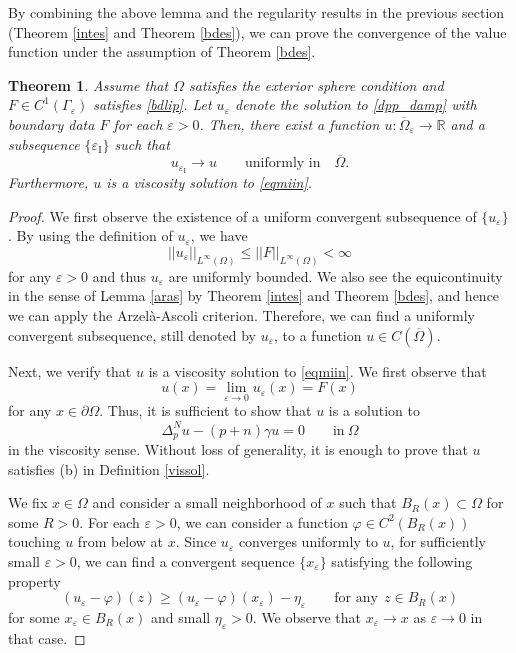 \documentclass[english]{amsart}
\newcommand{\eps}{\varepsilon}
\theoremstyle{plain}
\newtheorem{theorem}[definition]{Theorem}
\theoremstyle{definition}
\theoremstyle{remark}
\numberwithin{equation}{section}
\begin{document}
By combining the above lemma and the regularity results in the previous section (Theorem \ref{intes} and Theorem \ref{bdes}), 
we can prove the convergence of the value function under the assumption of Theorem \ref{bdes}.
\begin{theorem}\label{conv}Assume that $\Omega$ satisfies the exterior sphere condition and  $ F \in C^1(\Gamma_{\eps}) $
satisfies \eqref{bdlip}.
Let $u_{\eps}$ denote the solution to \eqref{dpp_damp} with boundary data $ F  $ for each $\eps>0$.
Then, there exist a function $ u: \overline{\Omega}_{\eps} \to \mathbb{R}$ and a subsequence 
$ \{ \eps_{\textrm{I}} \} $ such that 
$$ u_{\eps_{\textrm{I}}} \to u \qquad \textrm{uniformly in} \quad \overline{\Omega}.$$
Furthermore, $u$ is a viscosity solution to \eqref{eqmiin}.
\end{theorem}
\begin{proof}
We first observe the existence of a uniform convergent subsequence of $\{u_{\eps}\}$.
By using the definition of $u_{\eps} $, we have
 $$||u_{\eps} ||_{L^{\infty}(\Omega)} \le ||F||_{L^{\infty}(\Omega)} < \infty $$
for any $\eps > 0$ and thus $u_{\eps} $ are uniformly bounded. 
We also see the equicontinuity in the sense of Lemma \ref{aras} by Theorem \ref{intes} and Theorem \ref{bdes},
and hence we can apply the Arzel\`{a}-Ascoli criterion.
Therefore, we can find a uniformly convergent subsequence, still denoted by $u_{\eps}$, to a function $u \in C(\overline{\Omega})$.

Next, we verify that $u$ is a viscosity solution to \eqref{eqmiin}.
We first observe that
$$ u(x) = \lim_{\eps \to 0}u_{\eps}(x) = F(x)$$
for any $x \in \partial\Omega$.
Thus, it is sufficient to show that $u$ is a solution to 
$$\Delta_{p}^{N} u-(p+n)\gamma u=0   \qquad \textrm{in} \ \Omega$$
in the viscosity sense.
Without loss of generality, it is enough to prove that $u$ satisfies (b) in Definition \ref{vissol}. 

We fix $x \in \Omega$ and consider a small neighborhood of $x$ such that 
$ B_{R}(x)  \subset \Omega $ for some $R>0$.
For each $\eps>0$, we can consider a function $\varphi \in C^{2}(B_{R}(x))$ touching $u$ from below at $x$.
Since $u_{\eps}$ converges uniformly to $u$, for sufficiently small $\eps >0$, we can find a convergent sequence $\{x_{\eps}\}$
satisfying the following property 
$$ (u_{\eps}-\varphi)(z) \ge (u_{\eps}-\varphi)(x_{\eps})-\eta_{\eps} \qquad\textrm{for any} \ \ z\in B_{R}(x) $$
for some $x_{\eps}\in B_{R}(x)$ and small $\eta_{\eps}>0$. 
We observe that $x_{\eps} \to x$ as $ \eps \to 0$ in that case.


\end{proof}
\end{document}

